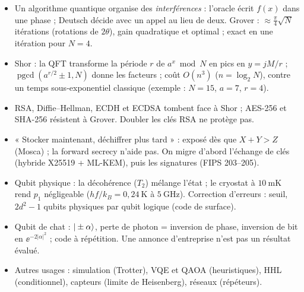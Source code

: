 \begin{aretenir}
\begin{itemize}
  \item Un algorithme quantique organise des \emph{interférences} : l'oracle écrit $f(x)$ dans une phase ; Deutsch décide avec un appel au lieu de deux.
        Grover : $\approx\frac\pi4\sqrt N$ itérations (rotations de $2\theta$), gain quadratique et optimal ; exact en une itération pour $N=4$.
  \item Shor : la QFT transforme la période $r$ de $a^x\bmod N$ en pics en $y=jM/r$ ; $\operatorname{pgcd}(a^{r/2}\pm1,N)$ donne les facteurs ;
        coût $O(n^3)$ ($n=\log_2N$), contre un temps sous-exponentiel classique (exemple : $N=15$, $a=7$, $r=4$).
  \item RSA, Diffie--Hellman, ECDH et ECDSA tombent face à Shor ; AES-256 et SHA-256 résistent à Grover. Doubler les clés RSA ne protège pas.
  \item « Stocker maintenant, déchiffrer plus tard » : exposé dès que $X+Y>Z$ (Mosca) ; la forward secrecy n'aide pas. On migre d'abord l'échange de clés
        (hybride X25519 + ML-KEM), puis les signatures (FIPS 203--205).
  \item Qubit physique : la décohérence ($T_2$) mélange l'état ; le cryostat à $10\ \mathrm{mK}$ rend $p_1$ négligeable ($hf/k_B=0{,}24\ \mathrm{K}$ à $5\ \mathrm{GHz}$). Correction
        d'erreurs : seuil, $2d^2-1$ qubits physiques par qubit logique (code de surface).
  \item Qubit de chat : $|\pm\alpha\rangle$, perte de photon = inversion de phase, inversion de bit en $\ee^{-2|\alpha|^2}$ ; code à répétition. Une annonce d'entreprise
        n'est pas un résultat évalué.
  \item Autres usages : simulation (Trotter), VQE et QAOA (heuristiques), HHL (conditionnel), capteurs (limite de Heisenberg), réseaux (répéteurs).
\end{itemize}
\end{aretenir}

